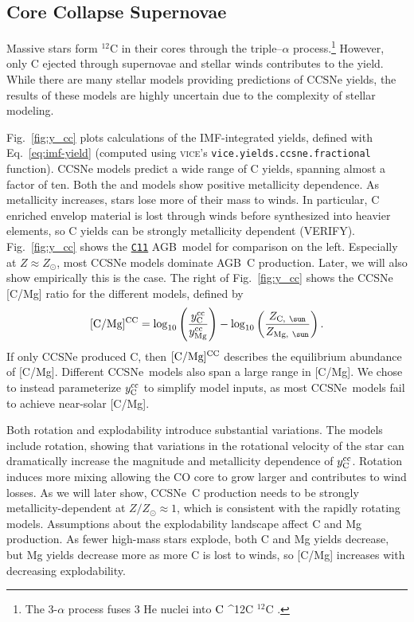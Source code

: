 \documentclass[fleqn,
usenatbib]{mnras}
\makeatletter
\newcommand{\VICE}{\textsc{vice}}
\newcommand{\cxi}{\texttt{\hyperlink{C11}{C11}}}
\newcommand{\agb}{AGB}
\newcommand{\cc}{CCSNe}
\newcommand{\imf}{IMF}
\newcommand{\C}[1][\@nil]{
    \def\tmp{#1}%
    \ifx\tmp\@nnil%
        \ensuremath{\rm C}%
    \else%
        \ifmmode ^{#1}{\rm C}%
        \else $^{#1}$C%
        \fi%
\fi }
\newcommand{\Ycc}{\ensuremath{y_{\rm C}^{\rm cc}}}
\newcommand{\Yoc}{\ensuremath{y_{\rm Mg}^{\rm cc}}}
\makeatother
\begin{document}
\subsection{Core Collapse Supernovae}


Massive stars form $^{12}$C in their cores through the triple--$\alpha$ process.\footnote{The 3-$\alpha$ process fuses 3 He nuclei into \C[12].} 
However, only C ejected through supernovae and stellar winds contributes to the yield. 
While there are many stellar models providing predictions of \cc{} yields, the results of these models are highly uncertain due to the complexity of stellar modeling.

Fig.~\ref{fig:y_cc} plots calculations of the \imf-integrated yields, defined with Eq.~\ref{eq:imf-yield} (computed using \VICE's \texttt{vice.yields.ccsne.fractional} function). 
\cc{} models predict a wide range of C yields, spanning almost a factor of ten. 
Both the \citet{NKT13} and \cite{LC18} models show positive metallicity dependence. 
As metallicity increases, stars lose more of their mass to winds. In particular, C enriched envelop material is lost through winds before synthesized into heavier elements, so C yields can be strongly metallicity dependent (VERIFY).
Fig.~\ref{fig:y_cc} shows the \cxi{} \agb\ model for comparison on the left. Especially at $Z\approx Z_\odot$, most \cc{} models dominate \agb\ C production. Later, we will also show empirically this is the case.
The right of Fig.~\ref{fig:y_cc} shows the \cc{} [C/Mg] ratio for the different models, defined by
\begin{equation}\label{eq:c_mg_cc}
    {\rm [C/Mg]^{CC}} = \log_{10}\left( \frac{\Ycc}{\Yoc}\right) - \log_{10} \left( \frac{Z_{{\rm C},\ \sun }}{Z_{{\rm Mg},\ \sun }} \right).
\end{equation}
If only \cc{} produced C, then ${\rm [C/Mg]^{CC}}$ describes the equilibrium abundance of [C/Mg].
Different \cc\ models also span a large range in [C/Mg]. 
We chose to instead parameterize $\Ycc$ to simplify model inputs, as most \cc\ models fail to achieve near-solar [C/Mg].

Both rotation and explodability introduce substantial variations. The \cite{LC18} models include rotation, showing that variations in the rotational velocity of the star can dramatically increase the magnitude and metallicity dependence of $\Ycc$. Rotation induces more mixing allowing the CO core to grow larger and contributes to wind losses. As we will later show, \cc\ C production needs to be strongly metallicity-dependent at $Z/Z_\odot \approx 1$, which is consistent with the \cite{LC18} rapidly rotating models.
Assumptions about the explodability landscape affect C and Mg production. As fewer high-mass stars explode, both C and Mg yields decrease, but Mg yields decrease more as more C is lost to winds, so [C/Mg] increases with decreasing explodability. 
\end{document}
